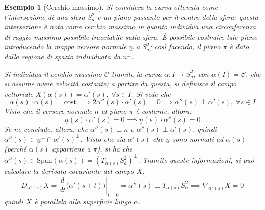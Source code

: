 \documentclass[12pt]{scrartcl}
\theoremstyle{style}
\newtheorem{esempio}{Esempio}[section]
\newcommand*\Eval[3]{\left.#1\right\rvert_{#2}^{#3}}
\numberwithin{equation}{subsection}
\begin{document}
\begin{esempio}
	[Cerchio massimo]
	Si considera la curva ottenuta come l'intersezione di una sfera $S^2_a$ e un piano passante per il centro della sfera: questa intersezione \`e nota come \textit{cerchio massimo} in quanto individua una circonferenza di raggio massimo possibile tracciabile sulla sfera.
	\`E possibile costruire tale piano introducendo la mappa versore normale $\underline{n}$ a $S_a^2$; cos\`i facendo, il piano $\pi$ \`e dato dalla regione di spazio individuata da $\underline{n}^\perp$.

	Si individua il cerchio massimo $\mathcal{C}$ tramite la curva $\alpha : I \to S^2_a$, con $\alpha (I) = \mathcal{C} $, che si assume avere velocit\`a costante; a partire da questa, si definisce il campo vettoriale $X(\alpha (s)) = \alpha '(s), \ \forall s \in I$.
	Si vede che
	\[
	\alpha (s) \cdot \alpha (s) = \text{cost}. \implies 2 \alpha ''(s) \cdot \alpha '(s) = 0 \implies \alpha ''(s) \perp \alpha ' (s), \ \forall s \in I
	\] 
	Visto che il versore normale $\underline{n}$ al piano $\pi$ \`e costante, allora:
\[
\underline{n}(s) \cdot \alpha '(s) = 0 \implies \underline{n}(s) \cdot \alpha ''(s) = 0
\] 
Se ne conclude, allora, che $\alpha ''(s) \perp \underline{n}$ e $\alpha ''(s) \perp \alpha '(s)$, quindi $\alpha ''(s) \in \underline{n}^\perp \cap \alpha '(s) ^\perp$.
Visto che sia $\alpha '(s)$ che $\underline{n}$ sono normali ad $\alpha (s)$ (perch\'e $\alpha (s)$ appartiene a $\pi$), si ha che $\alpha ''(s) \in \mathrm{Span} (\alpha (s)) = \left(T_{\alpha (s)} S^2_a\right) ^\perp$.
Tramite queste informazioni, si pu\`o calcolare la derivata covariante del campo $X$:
\[
D_{\alpha '(s)} X = \Eval{\frac{d }{d t} \big(\alpha '(s+t)\big)}{t=0}{} = \alpha '' (s) \perp T_{\alpha (s)} S^2_a \implies \nabla _{\alpha '(s)} X = 0 
\] 
quindi $X$ \`e parallelo alla superficie lungo $\alpha $.
\end{esempio}
\end{document}
